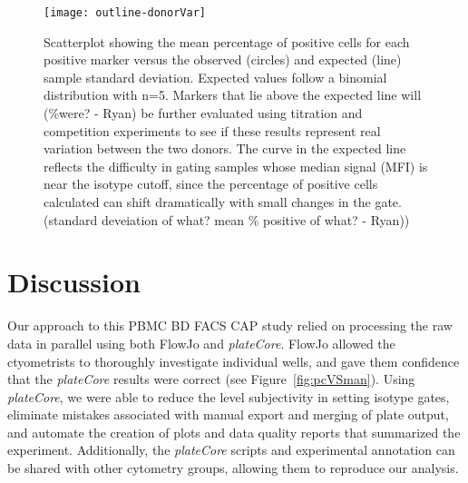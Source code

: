 \documentclass[12pt]{article}
\newcommand{\Rpackage}[1]{{\textit{#1}}}
\begin{document}
%
\begin{figure}
\centering
\texttt{[image: outline-donorVar]}
\caption{Scatterplot showing the mean percentage of positive cells for each
positive marker versus the observed (circles) and expected (line) sample
standard deviation. Expected values follow a binomial distribution with n=5.
Markers that lie above the expected line will (\%were? - Ryan) be further
evaluated using titration and competition experiments to see if these results
represent real variation between the two donors. The curve in the expected line
reflects the difficulty in gating samples whose median signal (MFI) is near the
isotype cutoff, since the percentage of positive cells calculated can shift
dramatically with small changes in the gate. (standard deveiation of what? mean
\% positive of what? - Ryan)) }
\label{fig:donorVar}
\end{figure}

%
%
%
%
%
%


\clearpage
\section*{Discussion}

Our approach to this PBMC BD FACS CAP study relied on processing the raw data
in parallel using both FlowJo and \Rpackage{plateCore}. FlowJo allowed the
ctyometrists to thoroughly investigate individual wells, and gave them
confidence that the \Rpackage{plateCore} results were correct (see
Figure~\ref{fig:pcVSman}). Using \Rpackage{plateCore}, we were able to reduce
the level subjectivity in setting isotype gates, eliminate mistakes associated
with manual export and merging of plate output, and automate the creation of
plots and data quality reports that summarized the experiment. Additionally,
the \Rpackage{plateCore} scripts and experimental annotation can be shared with
other cytometry groups, allowing them to reproduce our analysis.
\end{document}
